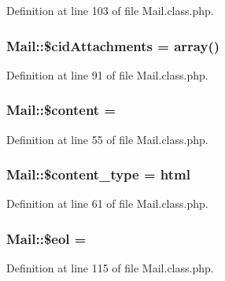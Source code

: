 Definition at line 103 of file Mail.\+class.\+php.

\hypertarget{classMail_a66c6752b550e4e8fd79a63b62815f48f}{}
\subsubsection[{\$cid\+Attachments}]{\setlength{\rightskip}{0pt plus 5cm}Mail\+::\$cid\+Attachments = array()}\label{classMail_a66c6752b550e4e8fd79a63b62815f48f}


Definition at line 91 of file Mail.\+class.\+php.

\hypertarget{classMail_a5a3320973718a2ca8a3fe798bf79c624}{}
\subsubsection[{\$content}]{\setlength{\rightskip}{0pt plus 5cm}Mail\+::\$content = \textquotesingle{}\textquotesingle{}}\label{classMail_a5a3320973718a2ca8a3fe798bf79c624}


Definition at line 55 of file Mail.\+class.\+php.

\hypertarget{classMail_ac933733b17efbb4978a46e557d32c440}{}
\subsubsection[{\$content\+\_\+type}]{\setlength{\rightskip}{0pt plus 5cm}Mail\+::\$content\+\_\+type = \textquotesingle{}html\textquotesingle{}}\label{classMail_ac933733b17efbb4978a46e557d32c440}


Definition at line 61 of file Mail.\+class.\+php.

\hypertarget{classMail_acaebf19cba0b8be83989e241c96f9eb7}{}
\subsubsection[{\$eol}]{\setlength{\rightskip}{0pt plus 5cm}Mail\+::\$eol = \textquotesingle{}\textquotesingle{}}\label{classMail_acaebf19cba0b8be83989e241c96f9eb7}


Definition at line 115 of file Mail.\+class.\+php.

\hypertarget{classMail_ace98431d0944d23544743094b443d506}{}
